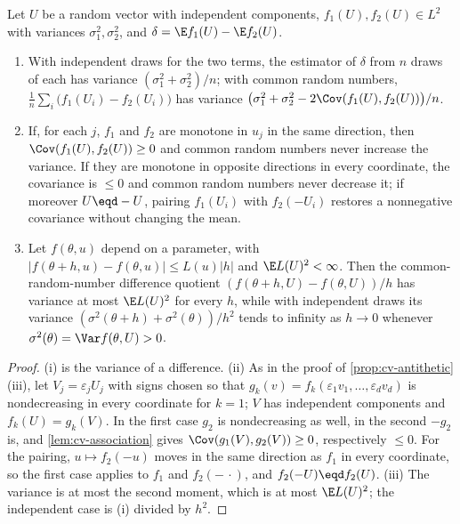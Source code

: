 \begin{proposition}\label{prop:cv-crn}
Let $U$ be a random vector with independent components, $f_1(U),f_2(U)\in L^2$ with
variances $\sigma_1^2,\sigma_2^2$, and $\delta=\E f_1(U)-\E f_2(U)$.
\begin{enumerate}[label=(\roman*)]
  \item With independent draws for the two terms, the estimator of $\delta$ from $n$ draws
    of each has variance $(\sigma_1^2+\sigma_2^2)/n$; with common random numbers,
    $\frac1n\sum_i\big(f_1(U_i)-f_2(U_i)\big)$ has variance
    $\big(\sigma_1^2+\sigma_2^2-2\Cov(f_1(U),f_2(U))\big)/n$.
  \item If, for each $j$, $f_1$ and $f_2$ are monotone in $u_j$ in the same direction, then
    $\Cov(f_1(U),f_2(U))\ge0$ and common random numbers never increase the variance. If they
    are monotone in opposite directions in every coordinate, the covariance is $\le0$ and
    common random numbers never decrease it; if moreover $U\eqd-U$, pairing $f_1(U_i)$ with
    $f_2(-U_i)$ restores a nonnegative covariance without changing the mean.
  \item Let $f(\theta,u)$ depend on a parameter, with
    $|f(\theta+h,u)-f(\theta,u)|\le L(u)|h|$ and $\E L(U)^2<\infty$. Then the common-random-number
    difference quotient $(f(\theta+h,U)-f(\theta,U))/h$ has variance at most $\E L(U)^2$
    for every $h$, while with independent draws its variance
    $(\sigma^2(\theta+h)+\sigma^2(\theta))/h^2$ tends to infinity as $h\to0$ whenever
    $\sigma^2(\theta)=\Var f(\theta,U)>0$.
\end{enumerate}
\end{proposition}

\begin{proof}
(i) is the variance of a difference. (ii) As in the proof of
\cref{prop:cv-antithetic}(iii), let $V_j=\varepsilon_jU_j$ with signs chosen so that
$g_k(v)=f_k(\varepsilon_1v_1,\dots,\varepsilon_dv_d)$ is nondecreasing in every coordinate for
$k=1$; $V$ has independent components and $f_k(U)=g_k(V)$. In the first case $g_2$ is
nondecreasing as well, in the second $-g_2$ is, and \cref{lem:cv-association} gives
$\Cov(g_1(V),g_2(V))\ge0$, respectively $\le0$. For the pairing, $u\mapsto f_2(-u)$ moves in
the same direction as $f_1$ in every coordinate, so the first case applies to $f_1$ and
$f_2(-\,\cdot)$, and $f_2(-U)\eqd f_2(U)$. (iii) The variance is at most the second moment,
which is at most $\E L(U)^2$; the independent case is (i) divided by $h^2$.
\end{proof}

